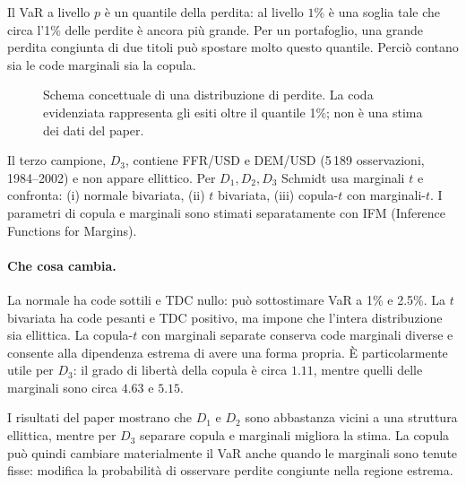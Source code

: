 \documentclass[11pt,a4paper]{article}
\begin{document}
Il VaR a livello $p$ è un quantile della perdita: al livello $1\%$ è una
soglia tale che circa l'1\% delle perdite è ancora più grande. Per un
portafoglio, una grande perdita congiunta di due titoli può spostare molto
questo quantile. Perciò contano sia le code marginali sia la copula.

\begin{figure}[ht]
\centering
{}
\caption{Schema concettuale di una distribuzione di perdite. La coda evidenziata rappresenta gli esiti oltre il quantile 1\%; non è una stima dei dati del paper.}
\label{fig:var-tail}
\end{figure}

Il terzo campione, $D_3$, contiene FFR/USD e DEM/USD (5\,189 osservazioni,
1984--2002) e non appare ellittico. Per $D_1,D_2,D_3$ Schmidt usa marginali
$t$ e confronta: (i) normale bivariata, (ii) $t$ bivariata, (iii) copula-$t$
con marginali-$t$. I parametri di copula e marginali sono stimati
separatamente con IFM (Inference Functions for Margins).

\paragraph{Che cosa cambia.}
La normale ha code sottili e TDC nullo: può sottostimare VaR a 1\% e 2.5\%.
La $t$ bivariata ha code pesanti e TDC positivo, ma impone che l'intera
distribuzione sia ellittica. La copula-$t$ con marginali separate conserva
code marginali diverse e consente alla dipendenza estrema di avere una forma
propria. È particolarmente utile per $D_3$: il grado di libertà della copula è
circa $1.11$, mentre quelli delle marginali sono circa $4.63$ e $5.15$.

I risultati del paper mostrano che $D_1$ e $D_2$ sono abbastanza vicini a una
struttura ellittica, mentre per $D_3$ separare copula e marginali migliora la
stima. La copula può quindi cambiare materialmente il VaR anche quando le
marginali sono tenute fisse: modifica la probabilità di osservare perdite
congiunte nella regione estrema.
\end{document}
